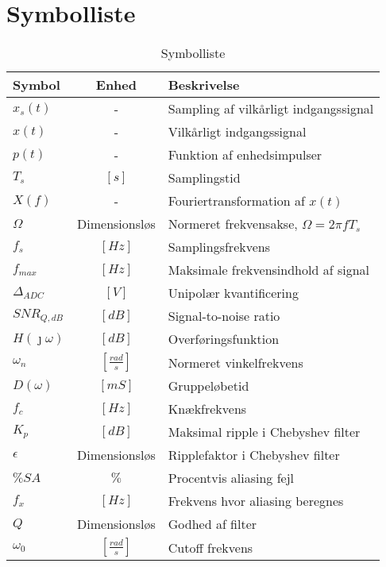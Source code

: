\chapter{Symbolliste} \label{bilag:symbolliste}
\begin{table}[ht!]
	\caption{Symbolliste}
	\label{tab:symbolliste}
	\begin{threeparttable}
		\begin{tabular}{l c p{}}
			\toprule
			\textbf{Symbol}      &
			\textbf{Enhed} & \textbf{Beskrivelse} \\
			\midrule
			$x_s(t)$ &	- & Sampling af vilkårligt indgangssignal \\
			$x(t)$   & 	- &  Vilkårligt indgangssignal \\
			$p(t)$	 & - & 	Funktion af enhedsimpulser \\
			$T_s$ 	 & $\left[\si{s}\right]$ & Samplingstid \\ 
			$X(f)$ &  -	 &	Fouriertransformation af $x(t)$ \\
			$\Omega$ & Dimensionsløs & Normeret frekvensakse, $\Omega = 2 \pi f T_s$ \\
			$f_s$ &	$\left[\si{Hz}\right]$ & Samplingsfrekvens \\
			$f_{max}$ & $\left[\si{Hz}\right]$ & Maksimale frekvensindhold af signal \\
			$\Delta_{ADC}$ & $[\si{V}]$ & Unipolær kvantificering \\
			$SNR_{Q, dB}$ & $[\si{dB}]$ & Signal-to-noise ratio \\
			$H(\jmath \omega)$ & $\left[\si{dB}\right]$ & Overføringsfunktion\\
			$\omega_n$ & $\left[\si{\frac{rad}{s}}\right]$ &  Normeret vinkelfrekvens \\
			$D(\omega)$ & $\left[\si{mS}\right]$ &  Gruppeløbetid \\
			$f_c$ & $\left[\si{Hz}\right]$ & Knækfrekvens \\
			$K_p$ & $\left[\si{dB}\right]$ & Maksimal ripple i Chebyshev filter \\
			$\epsilon$ & Dimensionsløs & Ripplefaktor i Chebyshev filter \\
			$\%SA$ & $\%$ & Procentvis aliasing fejl\\
			$f_x$ & $\left[\si{Hz}\right]$ & Frekvens hvor aliasing beregnes\\
			$Q$ & Dimensionsløs & Godhed af filter \\
			$\omega_0$ & $\left[\si{\frac{rad}{s}}\right]$ & Cutoff frekvens\\

\end{tabular}
\end{threeparttable}
\end{table}
